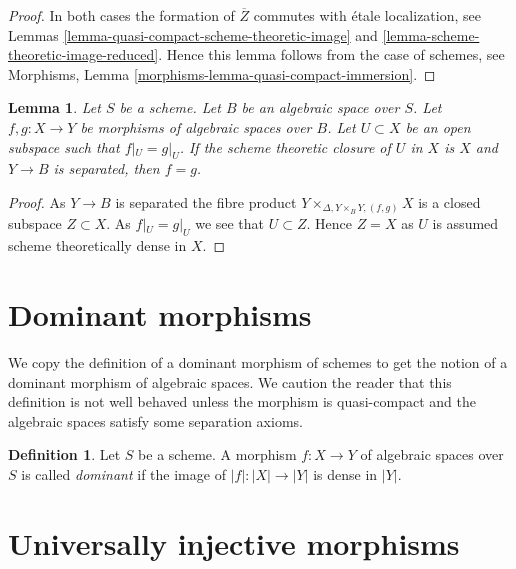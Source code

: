 \documentclass{stacks-project}
\theoremstyle{plain}
\newtheorem{lemma}[subsection]{Lemma}
\theoremstyle{definition}
\newtheorem{definition}[subsection]{Definition}
\theoremstyle{remark}
\numberwithin{equation}{subsection}
\begin{document}
\begin{proof}
In both cases the formation of $\overline{Z}$ commutes with
\'etale localization, see
Lemmas \ref{lemma-quasi-compact-scheme-theoretic-image} and
\ref{lemma-scheme-theoretic-image-reduced}.
Hence this lemma follows from the case of schemes, see
Morphisms, Lemma \ref{morphisms-lemma-quasi-compact-immersion}.
\end{proof}

\begin{lemma}
\label{lemma-equality-of-morphisms}
Let $S$ be a scheme. Let $B$ be an algebraic space over $S$.
Let $f, g : X \to Y$ be morphisms of algebraic spaces over $B$.
Let $U \subset X$ be an open subspace such that
$f|_U = g|_U$. If the scheme theoretic closure of $U$
in $X$ is $X$ and $Y \to B$ is separated, then $f = g$.
\end{lemma}

\begin{proof}
As $Y \to B$ is separated the fibre product
$Y \times_{\Delta, Y \times_B Y, (f, g)} X$ is a closed subspace $Z \subset X$. 
As $f|_U = g|_U$ we see that $U \subset Z$. Hence $Z = X$ as $U$ is assumed
scheme theoretically dense in $X$.
\end{proof}






\section{Dominant morphisms}
\label{section-dominant}

\noindent
We copy the definition of a dominant morphism of schemes to get the
notion of a dominant morphism of algebraic spaces. We caution the
reader that this definition is not well behaved unless the morphism
is quasi-compact and the algebraic spaces satisfy some separation
axioms.

\begin{definition}
\label{definition-dominant}
Let $S$ be a scheme. A morphism $f : X \to Y$ of algebraic spaces over $S$ is
called {\it dominant} if the image of $|f| : |X| \to |Y|$ is dense in $|Y|$.
\end{definition}






\section{Universally injective morphisms}
\label{section-universally-injective}
\end{document}
